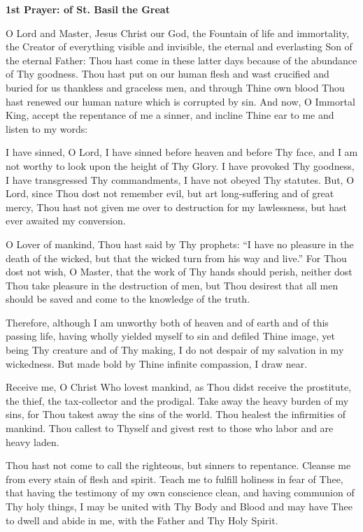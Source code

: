 \begin{center}
\textbf{1st Prayer: of St. Basil the Great}
\end{center}

O Lord and Master, Jesus Christ our God, the Fountain of life and immortality, the Creator of everything visible and invisible, the eternal and everlasting Son of the eternal Father: Thou hast come in these latter days because of the abundance of Thy goodness. Thou hast put on our human flesh and wast crucified and buried for us thankless and graceless men, and through Thine own blood Thou hast renewed our human nature which is corrupted by sin. And now, O Immortal King, accept the repentance of me a sinner, and incline Thine ear to me and listen to my words: 

I have sinned, O Lord, I have sinned before heaven and before Thy face, and I am not worthy to look upon the height of Thy Glory. I have provoked Thy goodness, I have transgressed Thy commandments, I have not obeyed Thy statutes. But, O Lord, since Thou dost not remember evil, but art long-suffering and of great mercy, Thou hast not given me over to destruction for my lawlessness, but hast ever awaited my conversion. 

O Lover of mankind, Thou hast said by Thy prophets: ``I have no pleasure in the death of the wicked, but that the wicked turn from his way and live.'' For Thou dost not wish, O Master, that the work of Thy hands should perish, neither dost Thou take pleasure in the destruction of men, but Thou desirest that all men should be saved and come to the knowledge of the truth. 

Therefore, although I am unworthy both of heaven and of earth and of this passing life, having wholly yielded myself to sin and defiled Thine image, yet being Thy creature and of Thy making, I do not despair of my salvation in my wickedness. But made bold by Thine infinite compassion, I draw near.

Receive me, O Christ Who lovest mankind, as Thou didst receive the prostitute, the thief, the tax-collector and the prodigal. Take away the heavy burden of my sins, for Thou takest away the sins of the world. Thou healest the infirmities of mankind. Thou callest to Thyself and givest rest to those who labor and are heavy laden. 

Thou hast not come to call the righteous, but sinners to repentance. Cleanse me from every stain of flesh and spirit. Teach me to fulfill holiness in fear of Thee, that having the testimony of my own conscience clean, and having communion of Thy holy things, I may be united with Thy Body and Blood and may have Thee to dwell and abide in me, with the Father and Thy Holy Spirit. 

